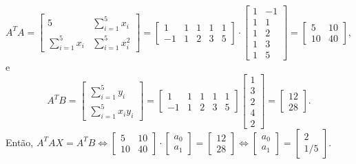 \documentclass[12pt,a4paper]{article}
\begin{document}
\begin{ExerciseList}
\[%
\]
\[
A^T A
= \begin{bmatrix}
 5                & \sum_{i=1}^5 x_i \\
\sum_{i=1}^5 x_i  & \sum_{i=1}^5 x_i^2
\end{bmatrix}
=\begin{bmatrix}
 1 & 1 & 1 & 1 & 1 \\
-1 & 1 & 2 & 3 & 5
\end{bmatrix}
\cdot
\begin{bmatrix}
  1 & -1 \\
  1 &  1 \\
  1 &  2 \\
  1 &  3 \\
  1 &  5
\end{bmatrix}
=\begin{bmatrix}
5 & 10 \\ 10 & 40
\end{bmatrix},
\]
e
\[
A^T B
= \begin{bmatrix}
 \sum_{i=1}^5 y_i \\
 \sum_{i=1}^5 x_i y_i
\end{bmatrix}
= \begin{bmatrix}
 1 & 1 & 1 & 1 & 1 \\
-1 & 1 & 2 & 3 & 5
\end{bmatrix}
\begin{bmatrix}
1 \\ 3 \\ 2 \\ 4 \\ 2
\end{bmatrix}
= \begin{bmatrix}
12 \\ 28
\end{bmatrix}.
\]
Então, 
$
A^T A X = A^T B
\Leftrightarrow
\begin{bmatrix}
5 & 10 \\ 10 & 40
\end{bmatrix}
\cdot
\begin{bmatrix}
a_0\\
a_1
\end{bmatrix}
=
\begin{bmatrix}
12 \\ 28
\end{bmatrix} 
\Leftrightarrow
\begin{bmatrix}
a_0\\
a_1
\end{bmatrix}
=
\begin{bmatrix}
2\\
1/5
\end{bmatrix}.
$


\end{ExerciseList}
\end{document}
